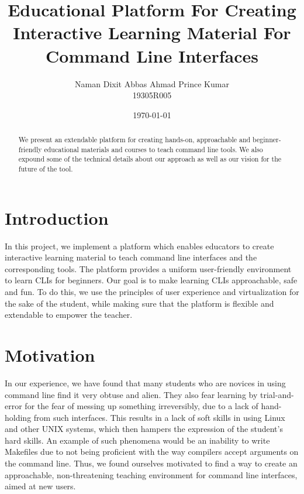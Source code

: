 \documentclass[a4paper]{article}
\begin{document}
\title{\textbf{\huge{Educational Platform For Creating Interactive Learning Material For Command Line Interfaces}}}
\author{\textbf\large{Naman Dixit \quad Abbas Ahmad \quad Prince Kumar \\ 19305R005 \quad\quad{} \quad{}}}
\date{\today}

\maketitle
\begin{abstract}
We present an extendable platform for creating hands-on, approachable and beginner-friendly  educational materials and courses to teach command line tools. We also expound some of the technical details about our approach as well as our vision for the future of the tool.

\end{abstract}
\maketitle

\section{Introduction}

In this project, we implement a platform which enables educators to create interactive learning material to teach command line interfaces and the corresponding tools. The platform provides a uniform user-friendly environment to learn CLIs for beginners. Our goal is to make learning CLIs approachable, safe and fun. To do this, we use the principles of user experience and virtualization for the sake of the student, while making sure that the platform is flexible and extendable to empower the teacher.

\section{Motivation}
In our experience, we have found that many students who are novices in using command line find it very obtuse and alien. They also fear learning by trial-and-error for the fear of messing up something irreversibly, due to a lack of hand-holding from such interfaces. This results in a lack of soft skills in using Linux and other UNIX systems, which then hampers the expression of the student's hard skills. An example of such phenomena would be an inability to write Makefiles due to not being proficient with the way compilers accept arguments on the command line. Thus, we found ourselves motivated to find a way to create an approachable, non-threatening teaching environment for command line interfaces, aimed at new users.
\end{document}
